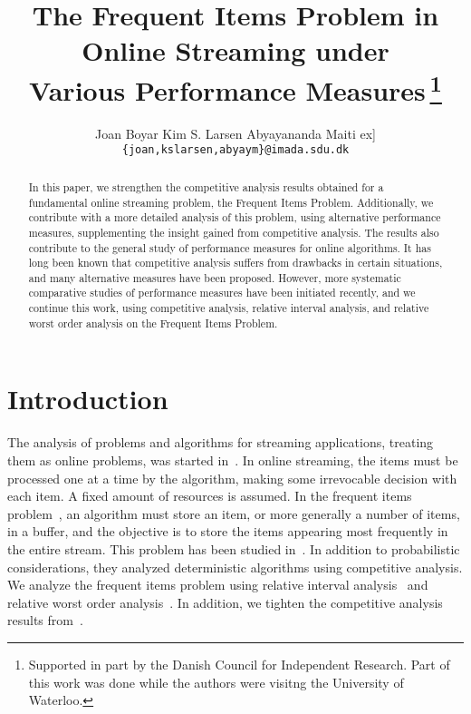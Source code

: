 \documentclass[11pt]{article}
\begin{document}
\title{The Frequent Items Problem in \\ Online Streaming
under \\ Various Performance Measures\,\thanks{Supported
in part by the Danish Council for Independent Research.  Part 
of this work was done while the
authors were visitng the University of Waterloo.}}

\author{Joan Boyar \hspace{2em} Kim S. Larsen \hspace{2em} Abyayananda Maiti \1ex]
        {\tt \{joan,kslarsen,abyaym\}@imada.sdu.dk}}

\date{}

\maketitle

\begin{abstract}
In this paper, we strengthen the competitive analysis results obtained
for a fundamental online streaming problem, the Frequent Items Problem.
Additionally, we contribute with a more detailed analysis of this
problem, using alternative performance measures,
supplementing the insight gained from competitive analysis.
The results also contribute to the general study of
performance measures for online algorithms. It has long been known
that competitive analysis suffers from drawbacks in certain situations,
and many alternative measures have been proposed. However, more
systematic comparative studies of performance measures have
been initiated recently, and we continue this work, using competitive
analysis, relative interval analysis, and relative worst order
analysis on the Frequent Items Problem.
\end{abstract}

\section{Introduction}
The analysis of problems and algorithms for streaming applications, treating
them as online problems, was started in~\cite{Becchetti09}. 
In online streaming, the
items must be processed one at a time by the algorithm, making some irrevocable
decision with each item. A fixed amount of resources is assumed.
In the frequent items problem~\cite{CH08},
an algorithm must store an item,
or more generally a number of items, in a buffer,
and the objective is to store the items appearing most frequently in
the entire stream.
This problem has been studied in~\cite{Giannakopoulos12}.
In addition to probabilistic considerations,
they analyzed deterministic algorithms using competitive analysis.
We analyze the frequent items problem using relative interval
analysis~\cite{Dorrigiv09} and relative worst order analysis~\cite{Boyar07}.
In addition, we tighten the competitive analysis~\cite{ST85,KMRS88}
results from~\cite{Giannakopoulos12}.
\end{document}
